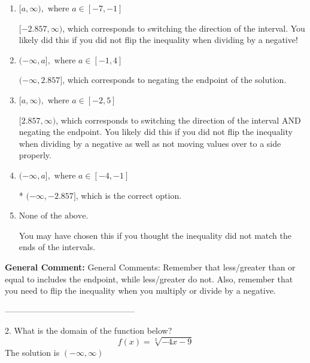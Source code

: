 \documentclass{extbook}[14pt]
\begin{document}
\begin{enumerate}[label=\Alph*.] 
\item $ [a, \infty), \text{ where } a \in [-7, -1] $ 

  $[-2.857, \infty)$, which corresponds to switching the direction of the interval. You likely did this if you did not flip the inequality when dividing by a negative! 
\item $ (-\infty, a], \text{ where } a \in [-1, 4] $ 

  $(-\infty, 2.857]$, which corresponds to negating the endpoint of the solution. 
\item $ [a, \infty), \text{ where } a \in [-2, 5] $ 

  $[2.857, \infty)$, which corresponds to switching the direction of the interval AND negating the endpoint. You likely did this if you did not flip the inequality when dividing by a negative as well as not moving values over to a side properly. 
\item $ (-\infty, a], \text{ where } a \in [-4, -1] $ 

 * $(-\infty, -2.857]$, which is the correct option. 
\item $ \text{None of the above}. $ 

 You may have chosen this if you thought the inequality did not match the ends of the intervals. 
\end{enumerate} 
 
\textbf{General Comment:} General Comments: Remember that less/greater than or equal to includes the endpoint, while less/greater do not. Also, remember that you need to flip the inequality when you multiply or divide by a negative. 

-----------------------------------------------

2. What is the domain of the function below?
\[ f(x) = \sqrt[3]{-4 x - 9} \] 
The solution is $ (-\infty, \infty) $ 
\end{document}
